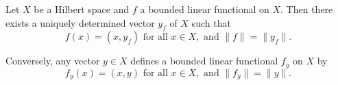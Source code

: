 \label{sec:III.6}

\begin{theoremn} Let $X$ be a Hilbert space and $f$ a bounded linear functional on $X$. Then there exists a uniquely determined vector $y_f$ of $X$ such that
\begin{equation}\label{eq:III.6.1}
f (x) = \left(x, y _{f}\right) \text{ for all } x \in X, \text{ and } \| f \| = \| y _{f} \|.
\end{equation}

Conversely, any vector $y \in X$ defines a bounded linear functional $f_y$ on $X$ by 
\begin{equation}\label{eq:III.6.2}
f _{y} (x) = (x, y) \text{ for all } x \in X, \text{ and } \| f _{y} \| = \| y \|.
\end{equation}

\end{theoremn}
